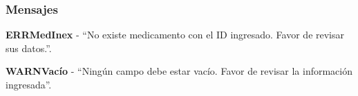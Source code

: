 \subsubsection{Mensajes}
	\begin{Citemize}
		\item {\bf ERRMedInex} - "`No existe medicamento con el ID ingresado. Favor de revisar sus datos."'.
		\item {\bf WARNVac\'io} - "`Ning\'un campo debe estar vac\'io. Favor de revisar la informaci\'on ingresada"'.
	\end{Citemize}